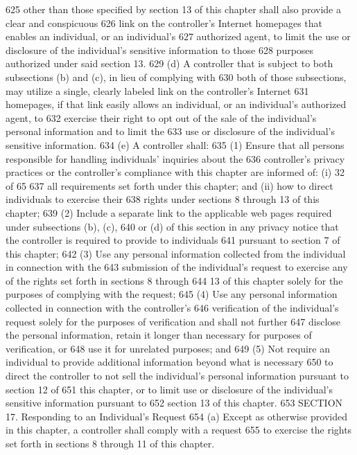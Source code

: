 625 other than those specified by section 13 of this chapter shall also provide a clear and conspicuous
626 link on the controller’s Internet homepages that enables an individual, or an individual’s
627 authorized agent, to limit the use or disclosure of the individual’s sensitive information to those
628 purposes authorized under said section 13.
629 (d) A controller that is subject to both subsections (b) and (c), in lieu of complying with
630 both of those subsections, may utilize a single, clearly labeled link on the controller’s Internet
631 homepages, if that link easily allows an individual, or an individual’s authorized agent, to
632 exercise their right to opt out of the sale of the individual’s personal information and to limit the
633 use or disclosure of the individual’s sensitive information.
634 (e) A controller shall:
635 (1) Ensure that all persons responsible for handling individuals’ inquiries about the
636 controller’s privacy practices or the controller’s compliance with this chapter are informed of: (i)
32 of 65
637 all requirements set forth under this chapter; and (ii) how to direct individuals to exercise their
638 rights under sections 8 through 13 of this chapter;
639 (2) Include a separate link to the applicable web pages required under subsections (b), (c),
640 or (d) of this section in any privacy notice that the controller is required to provide to individuals
641 pursuant to section 7 of this chapter;
642 (3) Use any personal information collected from the individual in connection with the
643 submission of the individual’s request to exercise any of the rights set forth in sections 8 through
644 13 of this chapter solely for the purposes of complying with the request;
645 (4) Use any personal information collected in connection with the controller’s
646 verification of the individual’s request solely for the purposes of verification and shall not further
647 disclose the personal information, retain it longer than necessary for purposes of verification, or
648 use it for unrelated purposes; and
649 (5) Not require an individual to provide additional information beyond what is necessary
650 to direct the controller to not sell the individual’s personal information pursuant to section 12 of
651 this chapter, or to limit use or disclosure of the individual’s sensitive information pursuant to
652 section 13 of this chapter.
653 SECTION 17. Responding to an Individual’s Request
654 (a) Except as otherwise provided in this chapter, a controller shall comply with a request
655 to exercise the rights set forth in sections 8 through 11 of this chapter.
